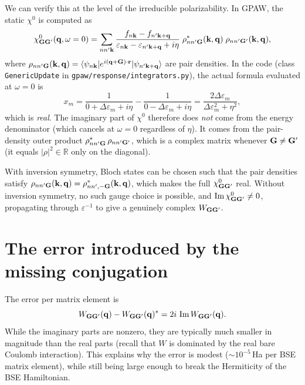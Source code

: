 \documentclass[11pt,a4paper]{article}
\begin{document}
We can verify this at the level of the irreducible polarizability.  In
GPAW, the static $\chi^0$ is computed as
\begin{equation}\label{eq:chi0}
  \chi^0_{\vb{GG}'}(\vb{q}, \omega = 0) = \sum_{nn'\vb{k}}
  \frac{f_{n\vb{k}} - f_{n'\vb{k}+\vb{q}}}
       {\varepsilon_{n\vb{k}} - \varepsilon_{n'\vb{k}+\vb{q}} + i\eta}
  \;\rho^*_{nn'\vb{G}}(\vb{k},\vb{q})\;
  \rho_{nn'\vb{G}'}(\vb{k},\vb{q}),
\end{equation}
where
$\rho_{nn'\vb{G}}(\vb{k},\vb{q})
= \langle \psi_{n\vb{k}} | e^{i(\vb{q}+\vb{G})\cdot\vb{r}} |
  \psi_{n'\vb{k}+\vb{q}} \rangle$
are pair densities.  In the code (class \texttt{GenericUpdate} in
\texttt{gpaw/response/integrators.py}), the actual formula evaluated at
$\omega = 0$ is
\begin{equation}\label{eq:xm}
  x_m = \frac{1}{0 + \Delta\varepsilon_m + i\eta}
       - \frac{1}{0 - \Delta\varepsilon_m + i\eta}
       = \frac{2\Delta\varepsilon_m}{\Delta\varepsilon_m^2 + \eta^2},
\end{equation}
which is \emph{real}.  The imaginary part of $\chi^0$ therefore does
\emph{not} come from the energy denominator (which cancels at $\omega =
0$ regardless of $\eta$).  It comes from the pair-density outer product
$\rho^*_{nn'\vb{G}}\,\rho_{nn'\vb{G}'}$, which is a complex matrix
whenever $\vb{G} \neq \vb{G}'$ (it equals $|\rho|^2 \in \mathbb{R}$
only on the diagonal).

With inversion symmetry, Bloch states can be chosen such that the pair
densities satisfy
$\rho_{nn'\vb{G}}(\vb{k},\vb{q})
= \rho^*_{nn',-\vb{G}}(\vb{k},\vb{q})$,
which makes the full $\chi^0_{\vb{GG}'}$ real.  Without inversion
symmetry, no such gauge choice is possible, and
$\operatorname{Im}\chi^0_{\vb{GG}'} \neq 0$, propagating through
$\varepsilon^{-1}$ to give a genuinely complex $W_{\vb{GG}'}$.

\section{The error introduced by the missing conjugation}

The error per matrix element is
\begin{equation}
  W_{\vb{GG}'}(\vb{q}) - W_{\vb{GG}'}(\vb{q})^*
  = 2i\,\operatorname{Im} W_{\vb{GG}'}(\vb{q}).
\end{equation}
While the imaginary parts are nonzero, they are typically much smaller
in magnitude than the real parts (recall that $W$ is dominated by the
real bare Coulomb interaction).  This explains why the error is modest
($\sim 10^{-5}$\,Ha per BSE matrix element), while still being large
enough to break the Hermiticity of the BSE Hamiltonian.
\end{document}
